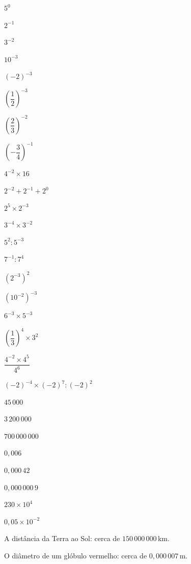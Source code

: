 \documentclass[12pt]{article}
\begin{document}


\begin{exercicios}
  \item $5^0$
  \item $2^{-1}$
  \item $3^{-2}$
  \item $10^{-3}$
  \item $(-2)^{-3}$
  \item $\left(\dfrac{1}{2}\right)^{-3}$
  \item $\left(\dfrac{2}{3}\right)^{-2}$
  \item $\left(-\dfrac{3}{4}\right)^{-1}$
  \item $4^{-2} \times 16$
  \item $2^{-2} + 2^{-1} + 2^0$
\end{exercicios}

\begin{exercicios}
  \item $2^5 \times 2^{-3}$
  \item $3^{-4} \times 3^{-2}$
  \item $5^{2} : 5^{-3}$
  \item $7^{-1} : 7^{4}$
  \item $(2^{-3})^2$
  \item $(10^{-2})^{-3}$
  \item $6^{-3} \times 5^{-3}$
  \item $\left(\dfrac{1}{3}\right)^{4} \times 3^{2}$
  \item $\dfrac{4^{-2} \times 4^{5}}{4^{6}}$
  \item $(-2)^{-4} \times (-2)^{7} : (-2)^{2}$
\end{exercicios}

\begin{exercicios}
  \item $45\,000$
  \item $3\,200\,000$
  \item $700\,000\,000$
  \item $0{,}006$
  \item $0{,}000\,42$
  \item $0{,}000\,000\,9$
  \item $230 \times 10^4$
  \item $0{,}05 \times 10^{-2}$
  \item A distância da Terra ao Sol: cerca de $150\,000\,000$\,km.
  \item O diâmetro de um glóbulo vermelho: cerca de $0{,}000\,007$\,m.
\end{exercicios}
\end{document}

